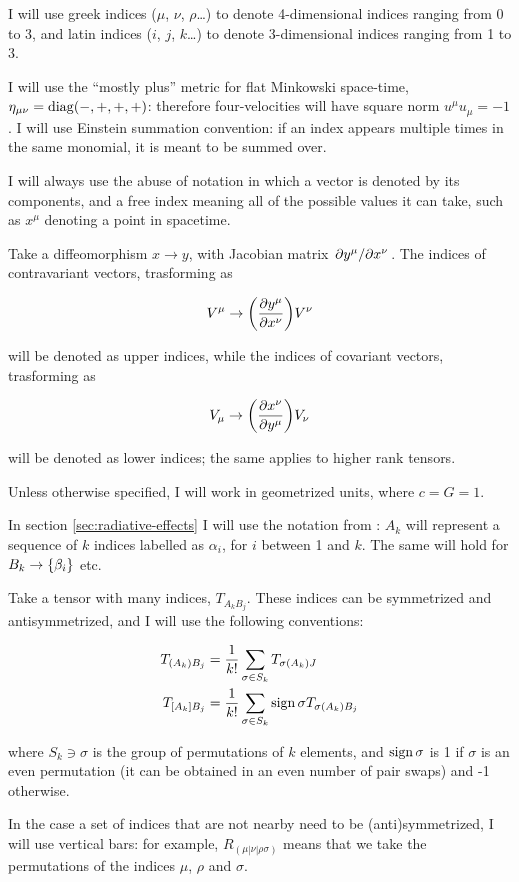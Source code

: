 \documentclass[main.tex]{subfiles}
\begin{document}
I will use greek indices ($\mu$, $\nu$, $\rho$\dots) to denote 4-dimensional indices ranging from 0 to 3, and latin indices ($i$, $j$, $k$\dots) to denote 3-dimensional indices ranging from 1 to 3.

I will use the ``mostly plus'' metric for flat Minkowski space-time, $\eta_{\mu \nu} = \operatorname{diag}(-, +, +, +)$: therefore four-velocities will have square norm \(u^\mu u_\mu = -1\).
I will use Einstein summation convention: if an index appears multiple times in the same monomial, it is meant to be summed over.

I will always use the abuse of notation in which a vector is denoted by its components, and a free index meaning all of the possible values it can take, such as \(x^\mu\) denoting a point in spacetime.

Take a diffeomorphism $x \rightarrow y$, with Jacobian matrix $\pdv*{y^\mu}{x^\nu}$.
The indices of contravariant vectors, trasforming as

\begin{equation}
    V^\mu \rightarrow \qty( \pdv{y^\mu}{x^\nu})  V^\nu
\end{equation}

will be denoted as upper indices, while the indices of covariant vectors, trasforming as

\begin{equation}
V_\mu \rightarrow \qty( \pdv{x^\nu}{y^\mu})  V_\nu
\end{equation}

will be denoted as lower indices; the same applies to higher rank tensors.

Unless otherwise specified, I will work in geometrized units, where $c = G = 1$.

In section \ref{sec:radiative-effects} I will use the notation from \textcite[]{Thorne:1981feb}: \(A_k\) will represent a sequence of \(k\) indices labelled as \(\alpha_i\), for \(i\) between 1 and \(k\). The same will hold for \(B_k \rightarrow \qty{\beta_i}\) etc.

Take a tensor with many indices, \(T_{A_k B_j}\). These indices can be symmetrized and antisymmetrized, and I will use the following conventions:

\begin{align}
    T_{(A_k) B_j } &= \frac{1}{k!} \sum_{\sigma \in S_k} T_{\sigma(A_k)J} \\
    T_{[A_k]B_j} &= \frac{1}{k!} \sum_{\sigma \in S_k} \sign{\sigma} T_{\sigma(A_k)B_j}
\end{align}

where \(S_k \ni \sigma \) is the group of permutations of $k$ elements, and $\operatorname{sign}{\sigma}$ is 1 if $\sigma$ is an even permutation (it can be obtained in an even number of pair swaps) and -1 otherwise.

In the case a set of indices that are not nearby need to be (anti)symmetrized, I will use vertical bars: for example, \(R_{(\mu | \nu| \rho \sigma)}\) means that we take the permutations of the indices \(\mu\), \(\rho\) and \(\sigma\).
\end{document}
